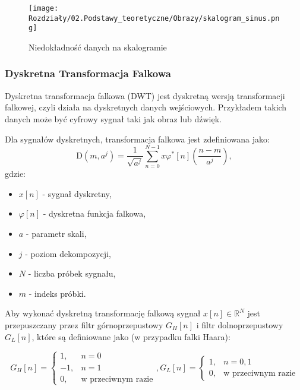 \begin{figure}[ht]
    \centering
    \begin{minipage}[t]{0.55\linewidth}
        \texttt{[image: Rozdziały/02.Podstawy\_teoretyczne/Obrazy/skalogram\_sinus.png]}
        \caption{Niedokładność danych na skalogramie}
        \label{fig:image40}
    \end{minipage}
\end{figure}

\newpage
\subsubsection{Dyskretna Transformacja Falkowa}

Dyskretna transformacja falkowa (DWT) jest dyskretną wersją transformacji falkowej, czyli działa na dyskretnych danych wejściowych. Przykładem takich danych może być cyfrowy sygnał taki jak obraz lub dźwięk. 

Dla sygnałów dyskretnych, transformacja falkowa jest zdefiniowana jako:
\begin{equation}
    \mathrm{D}\left(m, a^j\right)=\frac{1}{\sqrt{a^j}} \sum_{n=0}^{N-1} x\varphi^*[n] \left(\frac{n-m}{a^j}\right),
\end{equation}
gdzie:
\begin{itemize}
    \item $x[n]$ - sygnał dyskretny,
    \item $\varphi[n]$ - dyskretna funkcja falkowa,
    \item $a$ - parametr skali,
    \item $j$ - poziom dekompozycji,
    \item $N$ - liczba próbek sygnału,
    \item $m$ - indeks próbki.
\end{itemize}

Aby wykonać dyskretną transformację falkową sygnał $x[n] \in \mathbb{R}^N$ jest przepuszczany przez filtr górnoprzepustowy $G_H[n]$ i filtr dolnoprzepustowy $G_L[n]$, które są definiowane jako (w przypadku falki Haara):

\begin{equation}
    G_H[n]=\left\{\begin{array}{ll}
    1, & n=0 \\
    -1, & n=1 \\
    0, & \text {w przeciwnym razie}
    \end{array}, 
    G_L[n]= \begin{cases}1, & n=0,1 \\
    0, & \text {w przeciwnym razie}\end{cases}\right.
\end{equation}

